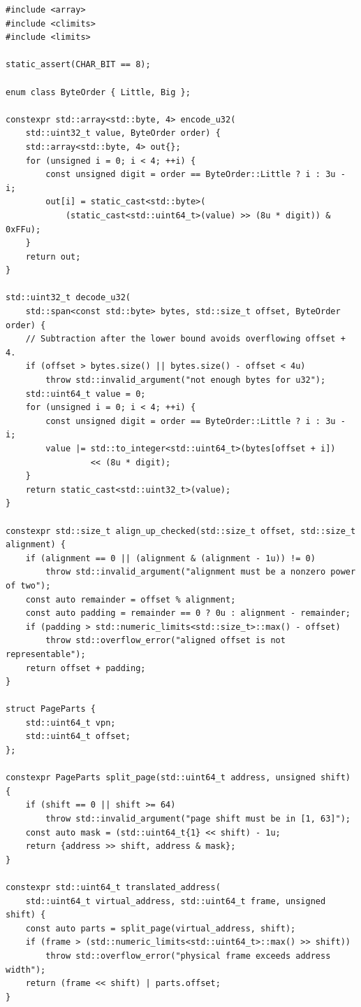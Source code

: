 \begin{verbatim}
#include <array>
#include <climits>
#include <limits>

static_assert(CHAR_BIT == 8);

enum class ByteOrder { Little, Big };

constexpr std::array<std::byte, 4> encode_u32(
    std::uint32_t value, ByteOrder order) {
    std::array<std::byte, 4> out{};
    for (unsigned i = 0; i < 4; ++i) {
        const unsigned digit = order == ByteOrder::Little ? i : 3u - i;
        out[i] = static_cast<std::byte>(
            (static_cast<std::uint64_t>(value) >> (8u * digit)) & 0xFFu);
    }
    return out;
}

std::uint32_t decode_u32(
    std::span<const std::byte> bytes, std::size_t offset, ByteOrder order) {
    // Subtraction after the lower bound avoids overflowing offset + 4.
    if (offset > bytes.size() || bytes.size() - offset < 4u)
        throw std::invalid_argument("not enough bytes for u32");
    std::uint64_t value = 0;
    for (unsigned i = 0; i < 4; ++i) {
        const unsigned digit = order == ByteOrder::Little ? i : 3u - i;
        value |= std::to_integer<std::uint64_t>(bytes[offset + i])
                 << (8u * digit);
    }
    return static_cast<std::uint32_t>(value);
}

constexpr std::size_t align_up_checked(std::size_t offset, std::size_t alignment) {
    if (alignment == 0 || (alignment & (alignment - 1u)) != 0)
        throw std::invalid_argument("alignment must be a nonzero power of two");
    const auto remainder = offset % alignment;
    const auto padding = remainder == 0 ? 0u : alignment - remainder;
    if (padding > std::numeric_limits<std::size_t>::max() - offset)
        throw std::overflow_error("aligned offset is not representable");
    return offset + padding;
}

struct PageParts {
    std::uint64_t vpn;
    std::uint64_t offset;
};

constexpr PageParts split_page(std::uint64_t address, unsigned shift) {
    if (shift == 0 || shift >= 64)
        throw std::invalid_argument("page shift must be in [1, 63]");
    const auto mask = (std::uint64_t{1} << shift) - 1u;
    return {address >> shift, address & mask};
}

constexpr std::uint64_t translated_address(
    std::uint64_t virtual_address, std::uint64_t frame, unsigned shift) {
    const auto parts = split_page(virtual_address, shift);
    if (frame > (std::numeric_limits<std::uint64_t>::max() >> shift))
        throw std::overflow_error("physical frame exceeds address width");
    return (frame << shift) | parts.offset;
}
\end{verbatim}


